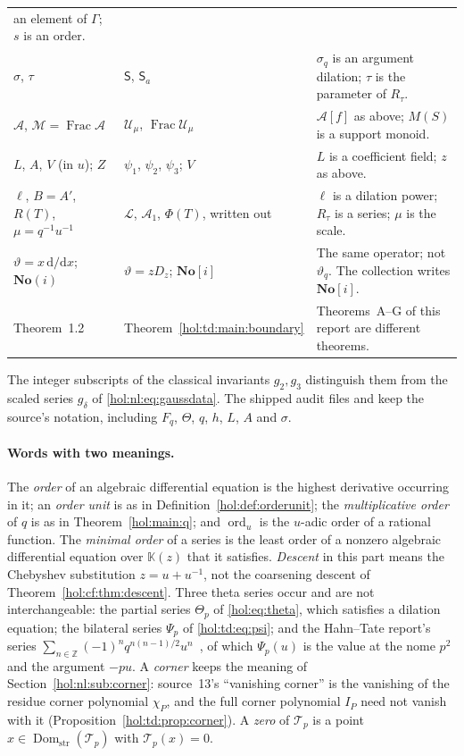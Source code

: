 \documentclass[11pt]{article}
\numberwithin{equation}{section}
\theoremstyle{definition}
\theoremstyle{remark}
\newcommand{\Z}{\mathbb Z}
\newcommand{\No}{\mathbf{No}}
\newcommand{\Dom}{\operatorname{Dom}_{\mathrm{str}}}
\newcommand{\KK}{\mathbb K}
\begin{document}
{\begin{longtable}{@{}>{\raggedright\arraybackslash}p{}
>{\raggedright\arraybackslash}p{}
>{\raggedright\arraybackslash}p{}@{}}
an element of $\Gamma$; $s$ is an order.\\
$\sigma$, $\tau$ & $\mathsf S$, $\mathsf S_a$ & $\sigma_q$ is an argument
dilation; $\tau$ is the parameter of $R_\tau$.\\
$\mathcal A$, $\mathcal M=\operatorname{Frac}\mathcal A$ & $\mathcal U_\mu$,
$\operatorname{Frac}\mathcal U_\mu$ & $\mathcal A[f]$ as above; $M(S)$ is a
support monoid.\\
$L$, $A$, $V$ (in $u$); $Z$ & $\psi_1$, $\psi_2$, $\psi_3$; $V$ & $L$ is a
coefficient field; $z$ as above.\\
$\ell$, $B=A'$, $R(T)$, $\mu=q^{-1}u^{-1}$ & $\mathcal L$, $\mathcal A_1$,
$\Phi(T)$, written out & $\ell$ is a dilation power; $R_\tau$ is a series;
$\mu$ is the scale.\\
$\vartheta=x\,\mathrm d/\mathrm d x$; $\No(i)$ & $\vartheta=zD_z$; $\No[i]$ & The same
operator; not $\vartheta_q$. The collection writes $\No[i]$.\\
Theorem~1.2 & Theorem~\ref{hol:td:main:boundary} & Theorems~A--G of this
report are different theorems.\\
\bottomrule
\end{longtable}}
The integer subscripts of the classical invariants $g_2,g_3$ distinguish them
from the scaled series $g_\delta$ of \eqref{hol:nl:eq:gaussdata}. The shipped
audit files  and
 keep the source's notation,
including $F_q$, $\Theta$, $q$, $h$, $L$, $A$ and $\sigma$.

\paragraph{Words with two meanings.}
The \emph{order} of an algebraic differential equation is the highest
derivative occurring in it; an \emph{order unit} is as in
Definition~\ref{hol:def:orderunit}; the \emph{multiplicative order} of $q$ is
as in Theorem~\ref{hol:main:q}; and $\operatorname{ord}_u$ is the $u$-adic
order of a rational function. The \emph{minimal order} of a series is the
least order of a nonzero algebraic differential equation over $\KK(z)$ that it
satisfies. \emph{Descent} in this part means the Chebyshev substitution
$z=u+u^{-1}$, not the coarsening descent of
Theorem~\ref{hol:cf:thm:descent}. Three theta series occur and are not
interchangeable: the partial series $\Theta_p$ of \eqref{hol:eq:theta}, which
satisfies a dilation equation; the bilateral series $\Psi_p$ of
\eqref{hol:td:eq:psi}; and the Hahn--Tate report's series
$\sum_{n\in\Z}(-1)^nq^{n(n-1)/2}u^n$~\cite{repotate}, of which $\Psi_p(u)$ is
the value at the nome $p^2$ and the argument $-pu$. A \emph{corner} keeps the
meaning of Section~\ref{hol:nl:sub:corner}: source~13's ``vanishing corner''
is the vanishing of the residue corner polynomial $\chi_P$, and the full
corner polynomial $I_P$ need not vanish with it
(Proposition~\ref{hol:td:prop:corner}). A \emph{zero} of $\mathcal T_p$ is a
point $x\in\Dom(\mathcal T_p)$ with $\mathcal T_p(x)=0$.
\end{document}
